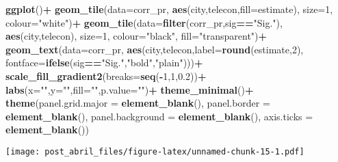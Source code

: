 \documentclass[]{article}
\newenvironment{Shaded}{\begin{snugshade}}{\end{snugshade}}
\newcommand{\KeywordTok}[1]{\textcolor[rgb]{0.13,0.29,0.53}{\textbf{#1}}}
\newcommand{\DataTypeTok}[1]{\textcolor[rgb]{0.13,0.29,0.53}{#1}}
\newcommand{\DecValTok}[1]{\textcolor[rgb]{0.00,0.00,0.81}{#1}}
\newcommand{\FloatTok}[1]{\textcolor[rgb]{0.00,0.00,0.81}{#1}}
\newcommand{\StringTok}[1]{\textcolor[rgb]{0.31,0.60,0.02}{#1}}
\newcommand{\OperatorTok}[1]{\textcolor[rgb]{0.81,0.36,0.00}{\textbf{#1}}}
\newcommand{\NormalTok}[1]{#1}
\begin{document}
\begin{Shaded}
\begin{Highlighting}[]
\KeywordTok{ggplot}\NormalTok{()}\OperatorTok{+}
\StringTok{  }\KeywordTok{geom_tile}\NormalTok{(}\DataTypeTok{data=}\NormalTok{corr_pr,}
            \KeywordTok{aes}\NormalTok{(city,telecon,}\DataTypeTok{fill=}\NormalTok{estimate),}
            \DataTypeTok{size=}\DecValTok{1}\NormalTok{,}
            \DataTypeTok{colour=}\StringTok{"white"}\NormalTok{)}\OperatorTok{+}
\StringTok{  }\KeywordTok{geom_tile}\NormalTok{(}\DataTypeTok{data=}\KeywordTok{filter}\NormalTok{(corr_pr,sig}\OperatorTok{==}\StringTok{"Sig."}\NormalTok{),}
            \KeywordTok{aes}\NormalTok{(city,telecon),}
            \DataTypeTok{size=}\DecValTok{1}\NormalTok{,}
            \DataTypeTok{colour=}\StringTok{"black"}\NormalTok{,}
            \DataTypeTok{fill=}\StringTok{"transparent"}\NormalTok{)}\OperatorTok{+}
\StringTok{  }\KeywordTok{geom_text}\NormalTok{(}\DataTypeTok{data=}\NormalTok{corr_pr,}
            \KeywordTok{aes}\NormalTok{(city,telecon,}\DataTypeTok{label=}\KeywordTok{round}\NormalTok{(estimate,}\DecValTok{2}\NormalTok{),}
            \DataTypeTok{fontface=}\KeywordTok{ifelse}\NormalTok{(sig}\OperatorTok{==}\StringTok{"Sig."}\NormalTok{,}\StringTok{"bold"}\NormalTok{,}\StringTok{"plain"}\NormalTok{)))}\OperatorTok{+}
\StringTok{  }\KeywordTok{scale_fill_gradient2}\NormalTok{(}\DataTypeTok{breaks=}\KeywordTok{seq}\NormalTok{(}\OperatorTok{-}\DecValTok{1}\NormalTok{,}\DecValTok{1}\NormalTok{,}\FloatTok{0.2}\NormalTok{))}\OperatorTok{+}
\StringTok{  }\KeywordTok{labs}\NormalTok{(}\DataTypeTok{x=}\StringTok{""}\NormalTok{,}\DataTypeTok{y=}\StringTok{""}\NormalTok{,}\DataTypeTok{fill=}\StringTok{""}\NormalTok{,}\DataTypeTok{p.value=}\StringTok{""}\NormalTok{)}\OperatorTok{+}
\StringTok{  }\KeywordTok{theme_minimal}\NormalTok{()}\OperatorTok{+}
\StringTok{  }\KeywordTok{theme}\NormalTok{(}\DataTypeTok{panel.grid.major =} \KeywordTok{element_blank}\NormalTok{(),}
        \DataTypeTok{panel.border =} \KeywordTok{element_blank}\NormalTok{(),}
        \DataTypeTok{panel.background =} \KeywordTok{element_blank}\NormalTok{(),}
        \DataTypeTok{axis.ticks =} \KeywordTok{element_blank}\NormalTok{())}
\end{Highlighting}
\end{Shaded}

\texttt{[image: post\_abril\_files/figure-latex/unnamed-chunk-15-1.pdf]}
\end{document}
